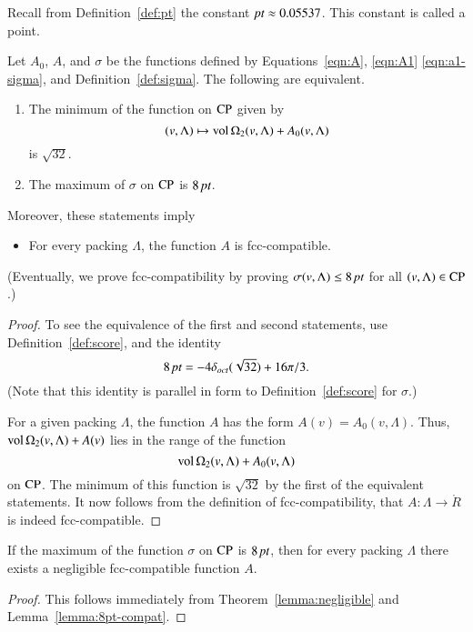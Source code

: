 Recall from Definition~\ref{def:pt} the constant $\hbox{\it pt}\approx
0.05537$.  This constant is called a point.

\begin{lemma}\label{lemma:8pt-compat}
Let $A_0$, $A$, and $\sigma$ be the functions defined by
Equations~\ref{eqn:A}, \ref{eqn:A1}  \ref{eqn:a1-sigma}, and
Definition~\ref{def:sigma}. The following are equivalent.
\begin{enumerate}
  \item The minimum of the function on ${\operatorname{CP}}$ given by
      $$(v,\Lambda)\mapsto {\operatorname{vol}}\,\Omega_2(v,\Lambda) + A_0(v,\Lambda)$$
is $\sqrt{32}$.
  \item The maximum of $\sigma$ on ${\operatorname{CP}}$ is $8\,\hbox{\it pt}$.
\end{enumerate}
Moreover, these statements imply
\begin{itemize}
  \item For every packing $\Lambda$,
  the function $A$ is
  fcc-compatible.
\end{itemize}
\end{lemma}

(Eventually, we prove fcc-compatibility by proving
$\sigma(v,\Lambda)\le8\,\hbox{\it pt}$ for all $(v,\Lambda)\in{\operatorname{CP}}$.)

\begin{proof} To see the equivalence of the first and second statements,
use Definition~\ref{def:score},  and the identity
   $$8\,\hbox{\it pt} = -4\delta_{oct} (\sqrt{32}) + 16 \pi/3.$$
(Note that this identity is parallel in form to
Definition~\ref{def:score} for $\sigma$.)

For a given packing $\Lambda$, the function $A$ has the
form $A(v) = A_0(v,\Lambda)$.    Thus,
${\operatorname{vol}}\,\Omega_2(v,\Lambda)+A(v)$ lies in the range of the function
   $${\operatorname{vol}}\,\Omega_2(v,\Lambda) + A_0(v,\Lambda)$$
on ${\operatorname{CP}}$.  The minimum of this function is $\sqrt{32}$ by the
first of the equivalent statements.  It now follows from the
definition of fcc-compatibility, that $A:\Lambda\to\ring{R}$ is
indeed fcc-compatible.
\end{proof}

\begin{theorem}\label{lemma:exista}
If the maximum of the function $\sigma$ on
${\operatorname{CP}}$ is $8\,\hbox{\it pt}$, then for every packing $\Lambda$
there exists a negligible fcc-compatible function $A$.
\end{theorem}

\begin{proof} This follows immediately from Theorem~\ref{lemma:negligible}
and Lemma~\ref{lemma:8pt-compat}.
\end{proof}

